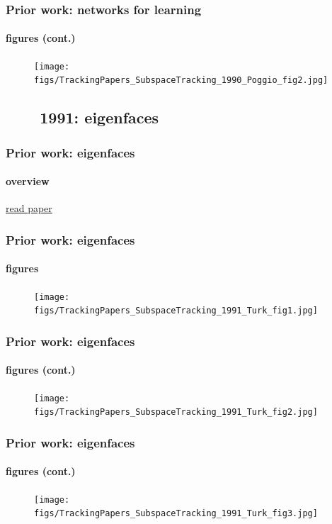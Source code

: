 \begin{frame}
\frametitle{Prior work: networks for learning}
\framesubtitle{figures (cont.)}
\mypagenum
	\begin{figure}
		\texttt{[image: figs/TrackingPapers\_SubspaceTracking\_1990\_Poggio\_fig2.jpg]}
	\end{figure}
\end{frame}


\subsection{\ \ \ \ 1991: eigenfaces}
\begin{frame}
\frametitle{Prior work: eigenfaces}
\framesubtitle{overview}
\mypagenum
	{\color{blue}  \href{http://users.ece.gatech.edu/~msalman/papers/1991 CNF, Face recognition using eigenfaces (Turk).pdf}{read paper}}
\end{frame}




\begin{frame}
\frametitle{Prior work: eigenfaces}
\framesubtitle{figures}
\mypagenum
	\begin{figure}
		\texttt{[image: figs/TrackingPapers\_SubspaceTracking\_1991\_Turk\_fig1.jpg]}
	\end{figure}
\end{frame}


\begin{frame}
\frametitle{Prior work: eigenfaces}
\framesubtitle{figures (cont.)}
\mypagenum
	\begin{figure}
		\texttt{[image: figs/TrackingPapers\_SubspaceTracking\_1991\_Turk\_fig2.jpg]}
	\end{figure}
\end{frame}


\begin{frame}
\frametitle{Prior work: eigenfaces}
\framesubtitle{figures (cont.)}
\mypagenum
	\begin{figure}
		\texttt{[image: figs/TrackingPapers\_SubspaceTracking\_1991\_Turk\_fig3.jpg]}
	\end{figure}
\end{frame}




